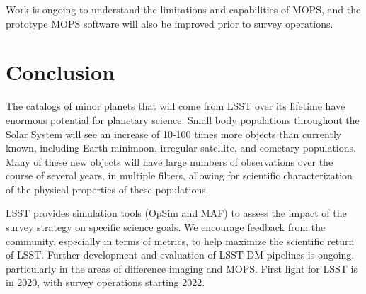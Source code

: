 \documentclass{iau}
\begin{document}
Work is ongoing to understand the limitations and capabilities of
MOPS, and the prototype MOPS software will also be improved
prior to survey operations.

\section{Conclusion}

The catalogs of minor planets that will come from LSST over its
lifetime have enormous potential for planetary science. Small body
populations throughout the Solar System will see an increase of 10-100
times more objects than currently known, including Earth minimoon,
irregular satellite, and cometary populations. Many of these new
objects will have large numbers of observations over the course of
several years, in multiple filters, allowing for scientific
characterization of the physical properties of these populations.

LSST provides simulation tools (OpSim and MAF) to assess the impact of
the survey strategy on specific science goals. We encourage feedback
from the community, especially in terms of metrics, to help maximize
the scientific return of LSST. Further development and evaluation of
LSST DM pipelines is ongoing, particularly in the areas of difference
imaging and MOPS. First light for LSST is in 2020, with survey
operations starting 2022.
\end{document}
